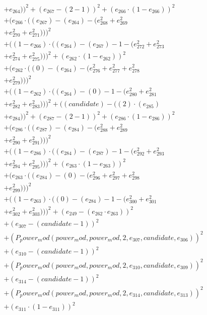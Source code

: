 \documentclass[10pt, a4paper]{article}
\begin{document}
\begin{align*}
& + e_{264}))^{2} + (e_{267} - (2 - 1))^{2} + (e_{266}  \cdot  (1 - e_{266}))^{2} \\
& + (e_{266}  \cdot  ((e_{267}) - (e_{264}) - (e_{268}^{2} + e_{269}^{2} \\
& + e_{270}^{2} + e_{271}^{2})))^{2} \\
& + ((1 - e_{266})  \cdot  ((e_{264}) - (e_{267}) - 1 - (e_{272}^{2} + e_{273}^{2} \\
& + e_{274}^{2} + e_{275}^{2})))^{2} + (e_{262}  \cdot  (1 - e_{262}))^{2} \\
& + (e_{262}  \cdot  ((0) - (e_{264}) - (e_{276}^{2} + e_{277}^{2} + e_{278}^{2} \\
& + e_{279}^{2})))^{2} \\
& + ((1 - e_{262})  \cdot  ((e_{264}) - (0) - 1 - (e_{280}^{2} + e_{281}^{2} \\
& + e_{282}^{2} + e_{283}^{2})))^{2} + ((candidate) - ((2)  \cdot  (e_{285}) \\
& + e_{284}))^{2} + (e_{287} - (2 - 1))^{2} + (e_{286}  \cdot  (1 - e_{286}))^{2} \\
& + (e_{286}  \cdot  ((e_{287}) - (e_{284}) - (e_{288}^{2} + e_{289}^{2} \\
& + e_{290}^{2} + e_{291}^{2})))^{2} \\
& + ((1 - e_{286})  \cdot  ((e_{284}) - (e_{287}) - 1 - (e_{292}^{2} + e_{293}^{2} \\
& + e_{294}^{2} + e_{295}^{2})))^{2} + (e_{263}  \cdot  (1 - e_{263}))^{2} \\
& + (e_{263}  \cdot  ((e_{284}) - (0) - (e_{296}^{2} + e_{297}^{2} + e_{298}^{2} \\
& + e_{299}^{2})))^{2} \\
& + ((1 - e_{263})  \cdot  ((0) - (e_{284}) - 1 - (e_{300}^{2} + e_{301}^{2} \\
& + e_{302}^{2} + e_{303}^{2})))^{2} + (e_{249} - (e_{262}  \cdot  e_{263}))^{2} \\
& + (e_{307} - (candidate - 1))^{2} \\
& + (P_power_mod(power_mod, power_mod, 2, e_{307}, candidate, e_{306}))^{2} \\
& + (e_{310} - (candidate - 1))^{2} \\
& + (P_power_mod(power_mod, power_mod, 2, e_{310}, candidate, e_{309}))^{2} \\
& + (e_{314} - (candidate - 1))^{2} \\
& + (P_power_mod(power_mod, power_mod, 2, e_{314}, candidate, e_{313}))^{2} \\
& + (e_{311}  \cdot  (1 - e_{311}))^{2} \\

\end{align*}
\end{document}

